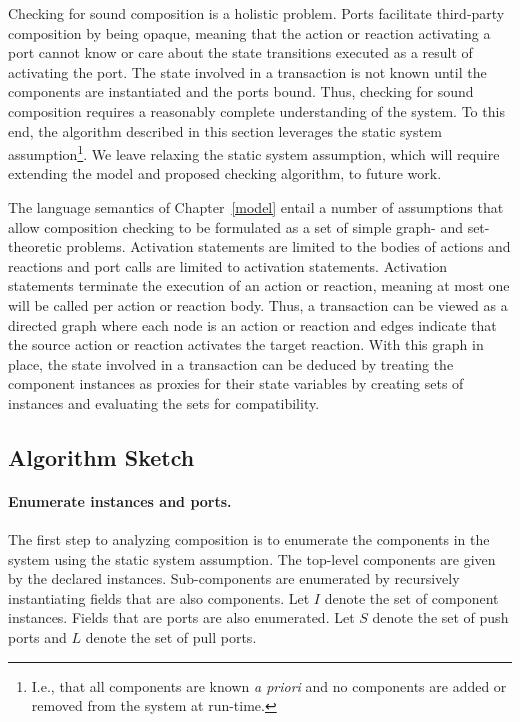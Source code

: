 Checking for sound composition is a holistic problem.
Ports facilitate third-party composition by being opaque, meaning that the action or reaction activating a port cannot know or care about the state transitions executed as a result of activating the port.
The state involved in a transaction is not known until the components are instantiated and the ports bound.
Thus, checking for sound composition requires a reasonably complete understanding of the system.
To this end, the algorithm described in this section leverages the static system assumption\footnote{I.e., that all components are known \emph{a priori} and no components are added or removed from the system at run-time.}.
We leave relaxing the static system assumption, which will require extending the model and proposed checking algorithm, to future work.

The language semantics of Chapter~\ref{model} entail a number of assumptions that allow composition checking to be formulated as a set of simple graph- and set-theoretic problems.
Activation statements are limited to the bodies of actions and reactions and port calls are limited to activation statements.
Activation statements terminate the execution of an action or reaction, meaning at most one will be called per action or reaction body.
Thus, a transaction can be viewed as a directed graph where each node is an action or reaction and edges indicate that the source action or reaction activates the target reaction.
With this graph in place, the state involved in a transaction can be deduced by treating the component instances as proxies for their state variables by creating sets of instances and evaluating the sets for compatibility.

\subsection{Algorithm Sketch}

\paragraph{Enumerate instances and ports.}
The first step to analyzing composition is to enumerate the components in the system using the static system assumption.
The top-level components are given by the declared instances.
Sub-components are enumerated by recursively instantiating fields that are also components.
Let $I$ denote the set of component instances.
Fields that are ports are also enumerated.
Let $S$ denote the set of push ports and $L$ denote the set of pull ports.


